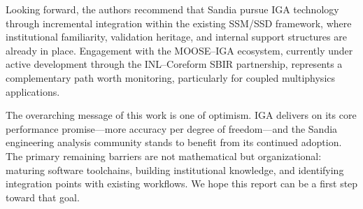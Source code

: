 \documentclass[12pt,report,justified]{SANDreport}
\begin{document}
Looking forward, the authors recommend that Sandia pursue IGA technology through
incremental integration within the existing SSM/SSD framework, where institutional
familiarity, validation heritage, and internal support structures are already in place.
Engagement with the MOOSE--IGA ecosystem, currently under active development through
the INL--Coreform SBIR partnership, represents a complementary path worth monitoring,
particularly for coupled multiphysics applications.

The overarching message of this work is one of optimism.  IGA delivers on its
core performance promise---more accuracy per degree of freedom---and the Sandia
engineering analysis community stands to benefit from its continued adoption.  
The primary remaining barriers are not mathematical but organizational: maturing software
toolchains, building institutional knowledge, and identifying integration points with
existing workflows.  We hope this report can be a first step toward that goal.


\end{document}
